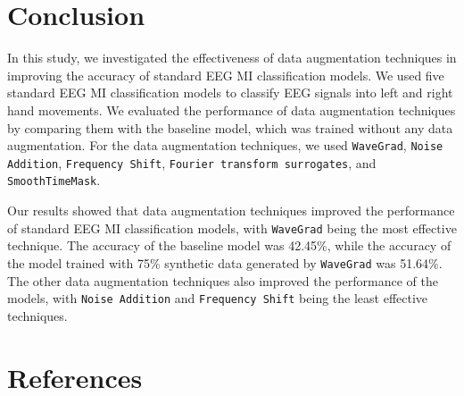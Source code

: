 \documentclass[12pt]{iopart}
\begin{document}











\section{Conclusion}
In this study, we investigated the effectiveness of data augmentation techniques in improving the accuracy of standard EEG MI classification models. 
We used five standard EEG MI classification models to classify EEG signals into left and right hand movements. 
We evaluated the performance of data augmentation techniques by comparing them with the baseline model, which was trained without any data augmentation. 
For the data augmentation techniques, we used \texttt{WaveGrad}, \texttt{Noise Addition}, \texttt{Frequency Shift}, \texttt{Fourier transform surrogates}, and \texttt{SmoothTimeMask}.

Our results showed that data augmentation techniques improved the performance of standard EEG MI classification models, with \texttt{WaveGrad} being the most effective technique. 
The accuracy of the baseline model was 42.45\%, while the accuracy of the model trained with 75\% synthetic data generated by \texttt{WaveGrad} was 51.64\%. 
The other data augmentation techniques also improved the performance of the models, with \texttt{Noise Addition} and \texttt{Frequency Shift} being the least effective techniques.



\section*{References}


\end{document}
